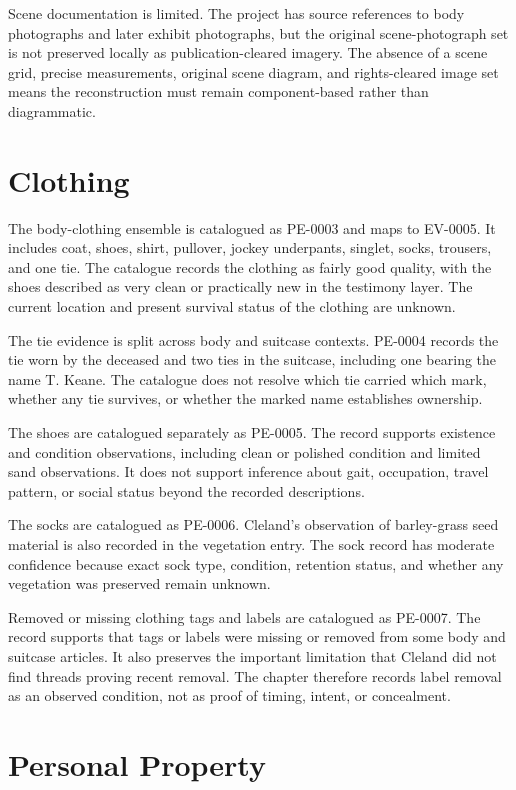 Scene documentation is limited. The project has source references to body photographs and later exhibit photographs, but the original scene-photograph set is not preserved locally as publication-cleared imagery. The absence of a scene grid, precise measurements, original scene diagram, and rights-cleared image set means the reconstruction must remain component-based rather than diagrammatic.

\section{Clothing}

The body-clothing ensemble is catalogued as PE-0003 and maps to EV-0005. It includes coat, shoes, shirt, pullover, jockey underpants, singlet, socks, trousers, and one tie. The catalogue records the clothing as fairly good quality, with the shoes described as very clean or practically new in the testimony layer. The current location and present survival status of the clothing are unknown.

The tie evidence is split across body and suitcase contexts. PE-0004 records the tie worn by the deceased and two ties in the suitcase, including one bearing the name T. Keane. The catalogue does not resolve which tie carried which mark, whether any tie survives, or whether the marked name establishes ownership.

The shoes are catalogued separately as PE-0005. The record supports existence and condition observations, including clean or polished condition and limited sand observations. It does not support inference about gait, occupation, travel pattern, or social status beyond the recorded descriptions.

The socks are catalogued as PE-0006. Cleland's observation of barley-grass seed material is also recorded in the vegetation entry. The sock record has moderate confidence because exact sock type, condition, retention status, and whether any vegetation was preserved remain unknown.

Removed or missing clothing tags and labels are catalogued as PE-0007. The record supports that tags or labels were missing or removed from some body and suitcase articles. It also preserves the important limitation that Cleland did not find threads proving recent removal. The chapter therefore records label removal as an observed condition, not as proof of timing, intent, or concealment.

\section{Personal Property}

